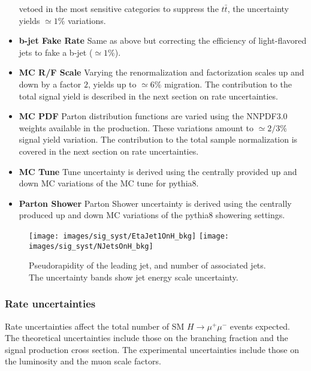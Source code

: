 \begin{itemize}
    vetoed in the most sensitive categories to suppress the {$t\bar{t}$}, the uncertainty yields $\simeq 1\%$ variations.
    \item {\bf b-jet Fake Rate}  Same as above but correcting the efficiency of light-flavored jets to fake a b-jet ($\simeq 1\%$).
    \item {\bf MC R/F Scale} Varying the renormalization and factorization scales up and down by a factor $2$, yields up to $\simeq 6\%$ migration.
    The contribution to the total signal yield is described in the next section on rate uncertainties.
    \item {\bf MC PDF} Parton distribution functions are varied using the NNPDF3.0 weights available in the production. 
    These variations amount to $\simeq 2/3\%$ signal yield variation. The contribution to the total sample normalization is covered in the 
    next section on rate uncertainties.
    \item {\bf MC Tune} Tune uncertainty is derived using the centrally provided up and down MC variations of the MC tune for pythia8.
    \item {\bf Parton Shower} Parton Shower uncertainty is derived using the centrally produced up and down MC variations of the pythia8 showering settings.
\end{itemize}

\begin{figure}[h!]
    \centering
    \texttt{[image: images/sig\_syst/EtaJet1OnH\_bkg]}
    \texttt{[image: images/sig\_syst/NJetsOnH\_bkg]}
    \caption[Uncertainty on some jet kinematics and counts.]
    {Pseudorapidity of the leading jet, and number of associated jets. The uncertainty bands show jet energy scale uncertainty.}
    \label{fig:jes}
\end{figure}

\subsubsection{Rate uncertainties}
Rate uncertainties affect the total number of SM $H\rightarrow\mu^+\mu^-$ events expected. The theoretical uncertainties include those on the branching fraction and the signal production cross section. The experimental uncertainties include those on the luminosity and the muon scale factors.  

